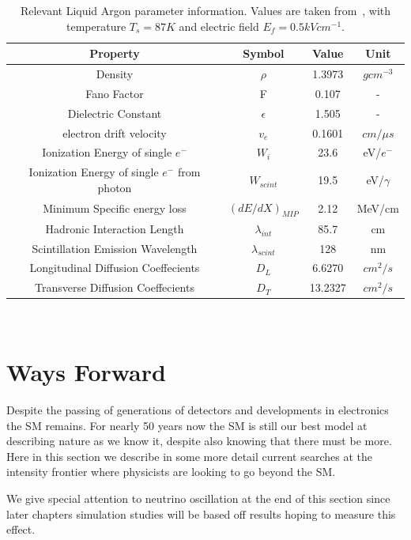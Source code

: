 \begin{table}
  \begin{center}
    \begin{tabular}{||c c c c||}
 \hline
      Property & Symbol & Value & Unit \\
 \hline\hline
      Density & $\rho$ &  1.3973 & $g cm^{-3}$ \\
      Fano Factor & F & 0.107 & - \\
      Dielectric Constant & $\epsilon$ & 1.505 & - \\
      electron drift velocity & $v_{e}$ & 0.1601 & $\unit{cm/\mu s}$ \\
      Ionization Energy of single $e^{-}$ & $W_{i}$ & 23.6 & eV/$e^{-}$ \\
      Ionization Energy of single $e^{-}$ from photon & $W_{scint}$ & 19.5 & eV/$\gamma$ \\
      Minimum Specific energy loss & $(dE/dX)_{MIP}$ & 2.12 & MeV/cm \\
      Hadronic Interaction Length & $\lambda_{int}$ &85.7 & cm \\
      Scintillation Emission Wavelength & $\lambda_{scint}$ & 128 & nm \\
      Longitudinal Diffusion Coeffecients & $D_{L}$ & 6.6270 & $cm^{2}/s$ \\
      Transverse Diffusion Coeffecients & $D_{T}$ & 13.2327 & $cm^{2}/s$ \\
 \hline
    \end{tabular}
    \caption{Relevant Liquid Argon parameter information. Values are taken from~\citep{lardata_lbnl}, with temperature $T_{s} = 87 K$ and electric field $E_{f} = 0.5 kV cm^{-1}$.}
  \end{center}
\end{table}~\label{tab:lar_prop}

\section{Ways Forward}

Despite the passing of generations of detectors and developments in electronics the SM remains.
For nearly 50 years now the SM is still our best model at describing nature as we know it, despite also knowing that there must be more.
Here in this section we describe in some more detail current searches at the intensity frontier where physicists are looking to go beyond the SM.

We give special attention to neutrino oscillation at the end of this section since later chapters simulation studies will be based off results hoping to measure this effect.

